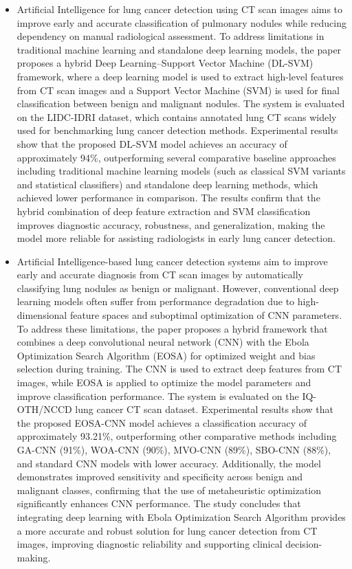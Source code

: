 \begin{itemize} \itemsep 10pt
	\item Artificial Intelligence for lung cancer detection using CT scan images aims to improve early and accurate classification of pulmonary nodules while reducing dependency on manual radiological assessment. To address limitations in traditional machine learning and standalone deep learning models, the paper proposes a hybrid Deep Learning–Support Vector Machine (DL-SVM) framework, where a deep learning model is used to extract high-level features from CT scan images and a Support Vector Machine (SVM) is used for final classification between benign and malignant nodules. The system is evaluated on the LIDC-IDRI dataset, which contains annotated lung CT scans widely used for benchmarking lung cancer detection methods. Experimental results show that the proposed DL-SVM model achieves an accuracy of approximately 94\%, outperforming several comparative baseline approaches including traditional machine learning models (such as classical SVM variants and statistical classifiers) and standalone deep learning methods, which achieved lower performance in comparison. The results confirm that the hybrid combination of deep feature extraction and SVM classification improves diagnostic accuracy, robustness, and generalization, making the model more reliable for assisting radiologists in early lung cancer detection. \cite{cancers14215457}
	\item Artificial Intelligence-based lung cancer detection systems aim to improve early and accurate diagnosis from CT scan images by automatically classifying lung nodules as benign or malignant. However, conventional deep learning models often suffer from performance degradation due to high-dimensional feature spaces and suboptimal optimization of CNN parameters. To address these limitations, the paper proposes a hybrid framework that combines a deep convolutional neural network (CNN) with the Ebola Optimization Search Algorithm (EOSA) for optimized weight and bias selection during training. The CNN is used to extract deep features from CT images, while EOSA is applied to optimize the model parameters and improve classification performance. The system is evaluated on the IQ-OTH/NCCD lung cancer CT scan dataset. Experimental results show that the proposed EOSA-CNN model achieves a classification accuracy of approximately 93.21\%, outperforming other comparative methods including GA-CNN (91\%), WOA-CNN (90\%), MVO-CNN (89\%), SBO-CNN (88\%), and standard CNN models with lower accuracy. Additionally, the model demonstrates improved sensitivity and specificity across benign and malignant classes, confirming that the use of metaheuristic optimization significantly enhances CNN performance. The study concludes that integrating deep learning with Ebola Optimization Search Algorithm provides a more accurate and robust solution for lung cancer detection from CT images, improving diagnostic reliability and supporting clinical decision-making. \cite{10.1371/journal.pone.0285796}

\end{itemize}
